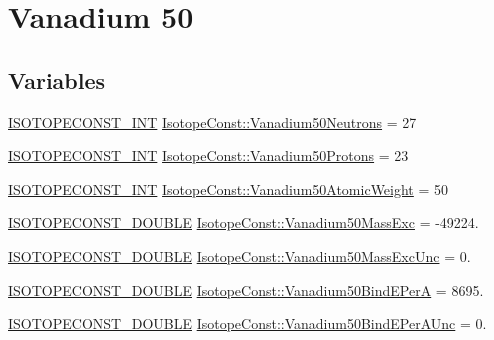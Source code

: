 \hypertarget{group___isotope_const-_vanadium-_v50}{}\section{Vanadium 50}
\label{group___isotope_const-_vanadium-_v50}
\subsection*{Variables}
\begin{DoxyCompactItemize}
\item 
\mbox{\hyperlink{group___isotope_const-_macros_ga5f18360b3e99483a35c32d789e62621c}{I\+S\+O\+T\+O\+P\+E\+C\+O\+N\+S\+T\+\_\+\+I\+NT}} \mbox{\hyperlink{group___isotope_const-_vanadium-_v50_gaec93923fa000b9e17447fc2af8336832}{Isotope\+Const\+::\+Vanadium50\+Neutrons}} = 27
\item 
\mbox{\hyperlink{group___isotope_const-_macros_ga5f18360b3e99483a35c32d789e62621c}{I\+S\+O\+T\+O\+P\+E\+C\+O\+N\+S\+T\+\_\+\+I\+NT}} \mbox{\hyperlink{group___isotope_const-_vanadium-_v50_ga3a43a9c40781ae97817a1b8ffc01f5f9}{Isotope\+Const\+::\+Vanadium50\+Protons}} = 23
\item 
\mbox{\hyperlink{group___isotope_const-_macros_ga5f18360b3e99483a35c32d789e62621c}{I\+S\+O\+T\+O\+P\+E\+C\+O\+N\+S\+T\+\_\+\+I\+NT}} \mbox{\hyperlink{group___isotope_const-_vanadium-_v50_gaaa7192687b55a5aceb862b61998e78e5}{Isotope\+Const\+::\+Vanadium50\+Atomic\+Weight}} = 50
\item 
\mbox{\hyperlink{group___isotope_const-_macros_ga8f45a7272ce02c0b4c65c44636ed719a}{I\+S\+O\+T\+O\+P\+E\+C\+O\+N\+S\+T\+\_\+\+D\+O\+U\+B\+LE}} \mbox{\hyperlink{group___isotope_const-_vanadium-_v50_ga58365841eaf94831af3e1e0d929caa69}{Isotope\+Const\+::\+Vanadium50\+Mass\+Exc}} = -\/49224.
\item 
\mbox{\hyperlink{group___isotope_const-_macros_ga8f45a7272ce02c0b4c65c44636ed719a}{I\+S\+O\+T\+O\+P\+E\+C\+O\+N\+S\+T\+\_\+\+D\+O\+U\+B\+LE}} \mbox{\hyperlink{group___isotope_const-_vanadium-_v50_ga77d1c1fd4569a133c99478ebc7653f68}{Isotope\+Const\+::\+Vanadium50\+Mass\+Exc\+Unc}} = 0.
\item 
\mbox{\hyperlink{group___isotope_const-_macros_ga8f45a7272ce02c0b4c65c44636ed719a}{I\+S\+O\+T\+O\+P\+E\+C\+O\+N\+S\+T\+\_\+\+D\+O\+U\+B\+LE}} \mbox{\hyperlink{group___isotope_const-_vanadium-_v50_gab88bb5fa83504ab2851277840a5f767d}{Isotope\+Const\+::\+Vanadium50\+Bind\+E\+PerA}} = 8695.
\item 
\mbox{\hyperlink{group___isotope_const-_macros_ga8f45a7272ce02c0b4c65c44636ed719a}{I\+S\+O\+T\+O\+P\+E\+C\+O\+N\+S\+T\+\_\+\+D\+O\+U\+B\+LE}} \mbox{\hyperlink{group___isotope_const-_vanadium-_v50_ga53c07bd5708c24530d4eae6fba7fa3cd}{Isotope\+Const\+::\+Vanadium50\+Bind\+E\+Per\+A\+Unc}} = 0.

\end{DoxyCompactItemize}
